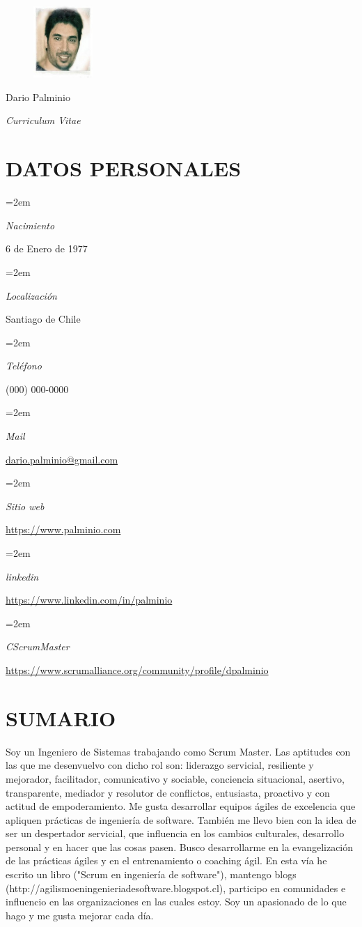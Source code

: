 \documentclass[paper=a4,fontsize=11pt]{scrartcl} %
\newlength{\spacebox}
\newcommand{\sepspace}{\vspace*{1em}}		%
\newcommand{\MyName}[1]{ %
		\Huge \usefont{OT1}{phv}{b}{n} \hfill #1
		\par \normalsize \normalfont}
\newcommand{\MySlogan}[1]{ %
		\large \usefont{OT1}{phv}{m}{n}\hfill \textit{#1}
		\par \normalsize \normalfont}
\newcommand{\NewPart}[1]{\section*{\uppercase{#1}}}
\newcommand{\PersonalEntry}[2]{
		\noindent\hangindent=2em\hangafter=0 %
		\parbox{\spacebox}{        %
		\textit{#1}}		       %
		\hspace{1.5em} #2 \par}    %
\begin{document}

\begin{figure}
	\hfill
	\includegraphics[width=0.2\textwidth]{photo}
	\vspace{-7cm}
\end{figure}

\MyName{Dario Palminio}
\MySlogan{Curriculum Vitae}

\sepspace

\NewPart{Datos personales}{}

\PersonalEntry{Nacimiento}{6 de Enero de 1977}
\PersonalEntry{Localización}{Santiago de Chile}
\PersonalEntry{Teléfono}{(000) 000-0000}
\PersonalEntry{Mail}{\url{dario.palminio@gmail.com}}
\PersonalEntry{Sitio web}{\url{https://www.palminio.com}}
\PersonalEntry{linkedin}{\url{https://www.linkedin.com/in/palminio}}
\PersonalEntry{CScrumMaster}{\url{https://www.scrumalliance.org/community/profile/dpalminio}}

\NewPart{Sumario}{}

Soy un Ingeniero de Sistemas trabajando como Scrum Master. Las aptitudes con las que me desenvuelvo con dicho rol son: liderazgo servicial, resiliente y mejorador, facilitador, comunicativo y sociable, conciencia situacional, asertivo, transparente, mediador y resolutor de conflictos, entusiasta, proactivo y con actitud de empoderamiento. 
Me gusta desarrollar equipos ágiles de excelencia que apliquen prácticas de ingeniería de software. También me llevo bien con la idea de ser un despertador servicial, que influencia en los cambios culturales, desarrollo personal y en hacer que las cosas pasen. Busco desarrollarme en la evangelización de las prácticas ágiles y en el entrenamiento o coaching ágil. En esta vía he escrito un libro ("Scrum en ingeniería de software"), mantengo blogs (http://agilismoeningenieriadesoftware.blogspot.cl), participo en comunidades e influencio en las organizaciones en las cuales estoy. Soy un apasionado de lo que hago y me gusta mejorar cada día.
\end{document}
